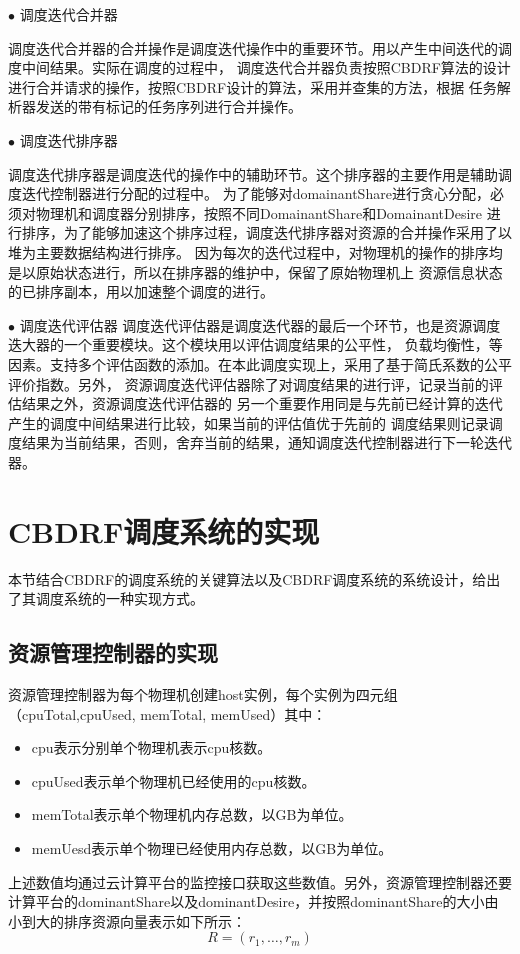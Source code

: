 $\bullet$ 调度迭代合并器

调度迭代合并器的合并操作是调度迭代操作中的重要环节。用以产生中间迭代的调度中间结果。实际在调度的过程中，
调度迭代合并器负责按照CBDRF算法的设计进行合并请求的操作，按照CBDRF设计的算法，采用并查集的方法，根据
任务解析器发送的带有标记的任务序列进行合并操作。

$\bullet$ 调度迭代排序器

调度迭代排序器是调度迭代的操作中的辅助环节。这个排序器的主要作用是辅助调度迭代控制器进行分配的过程中。
为了能够对domainantShare进行贪心分配，必须对物理机和调度器分别排序，按照不同DomainantShare和DomainantDesire
进行排序，为了能够加速这个排序过程，调度迭代排序器对资源的合并操作采用了以堆为主要数据结构进行排序。
因为每次的迭代过程中，对物理机的操作的排序均是以原始状态进行，所以在排序器的维护中，保留了原始物理机上
资源信息状态的已排序副本，用以加速整个调度的进行。

$\bullet$  调度迭代评估器
调度迭代评估器是调度迭代器的最后一个环节，也是资源调度迭大器的一个重要模块。这个模块用以评估调度结果的公平性，
负载均衡性，等因素。支持多个评估函数的添加。在本此调度实现上，采用了基于简氏系数的公平评价指数。另外，
资源调度迭代评估器除了对调度结果的进行评，记录当前的评估结果之外，资源调度迭代评估器的
另一个重要作用同是与先前已经计算的迭代产生的调度中间结果进行比较，如果当前的评估值优于先前的
调度结果则记录调度结果为当前结果，否则，舍弃当前的结果，通知调度迭代控制器进行下一轮迭代器。

\section{CBDRF调度系统的实现}
本节结合CBDRF的调度系统的关键算法以及CBDRF调度系统的系统设计，给出了其调度系统的一种实现方式。
\subsection{资源管理控制器的实现}
资源管理控制器为每个物理机创建host实例，每个实例为四元组（cpuTotal,cpuUsed, memTotal, memUsed）其中：
\begin{itemize}
\item cpu表示分别单个物理机表示cpu核数。
\item cpuUsed表示单个物理机已经使用的cpu核数。
\item memTotal表示单个物理机内存总数，以GB为单位。
\item memUesd表示单个物理已经使用内存总数，以GB为单位。
\end{itemize}

上述数值均通过云计算平台的监控接口获取这些数值。另外，资源管理控制器还要计算平台的dominantShare以及dominantDesire，并按照dominantShare的大小由小到大的排序资源向量表示如下所示：
\begin{equation}
R=\left({r}_{1},…,{r}_{m}\right)
\end{equation}

